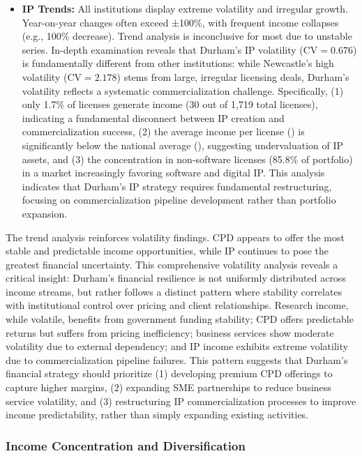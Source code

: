 \documentclass[journal,onecolumn, 10pt,draftclsnofoot]{IEEEtran}
\begin{document}
\begin{itemize}
    \item \textbf{IP Trends:} All institutions display extreme volatility and irregular growth. Year-on-year changes often exceed ±100\%, with frequent income collapses (e.g., 100\% decrease). Trend analysis is inconclusive for most due to unstable series. In-depth examination reveals that Durham's IP volatility ($\mathrm{CV}=0.676$) is fundamentally different from other institutions: while Newcastle's high volatility ($\mathrm{CV}=2.178$) stems from large, irregular licensing deals, Durham's volatility reflects a systematic commercialization challenge. Specifically, (1) only 1.7\% of licenses generate income (30 out of 1,719 total licenses), indicating a fundamental disconnect between IP creation and commercialization success, (2) the average income per license () is significantly below the national average (), suggesting undervaluation of IP assets, and (3) the concentration in non-software licenses (85.8\% of portfolio) in a market increasingly favoring software and digital IP. This analysis indicates that Durham's IP strategy requires fundamental restructuring, focusing on commercialization pipeline development rather than portfolio expansion.
\end{itemize}

The trend analysis reinforces volatility findings. CPD appears to offer the most stable and predictable income opportunities, while IP continues to pose the greatest financial uncertainty. This comprehensive volatility analysis reveals a critical insight: Durham's financial resilience is not uniformly distributed across income streams, but rather follows a distinct pattern where stability correlates with institutional control over pricing and client relationships. Research income, while volatile, benefits from government funding stability; CPD offers predictable returns but suffers from pricing inefficiency; business services show moderate volatility due to external dependency; and IP income exhibits extreme volatility due to commercialization pipeline failures. This pattern suggests that Durham's financial strategy should prioritize (1) developing premium CPD offerings to capture higher margins, (2) expanding SME partnerships to reduce business service volatility, and (3) restructuring IP commercialization processes to improve income predictability, rather than simply expanding existing activities.

\subsubsection{Income Concentration and Diversification}
\end{document}
